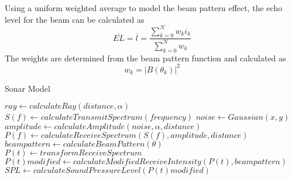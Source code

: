 \documentclass[11pt]{article}
\begin{document}
Using a uniform weighted average to model the beam pattern effect, the echo level for the beam can be calculated as 
\begin{equation}
    \overline{EL}=\overline{l}=\frac{\sum^N_{k=0}w_ki_k}{\sum^N_{k=0}w_k}
\end{equation}
The weights are determined from the beam pattern function and calculated as 
\begin{equation}
    w_k=|B(\theta_k)|^2
\end{equation}

\begin{algorithm}
\caption{Sonar Model}
\begin{algorithmic}
\STATE $ray \leftarrow calculateRay(distance, \alpha)$
\STATE $S(f) \leftarrow calculateTransmitSpectrum(frequency)$
        \STATE $noise \leftarrow Gaussian(x,y)$
        \STATE $amplitude \leftarrow calculateAmplitude(noise, \alpha, distance)$
        \STATE $P(f) \leftarrow calculateReceiveSpectrum(S(f), amplitude, distance)$
    \ENDFOR
    \STATE $beampattern \leftarrow calculateBeamPattern(\theta)$
    \STATE $P(t) \leftarrow transformReceiveSpectrum$
    \STATE $P(t)modified \leftarrow calculateModifiedReceiveIntensity(P(t), beampattern)$
\ENDFOR
\STATE $SPL \leftarrow calculateSoundPressureLevel(P(t)modified)$
\end{algorithmic}
\end{algorithm}





\end{document}
